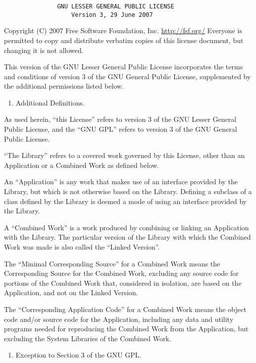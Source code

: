 \begin{verbatim}
               GNU LESSER GENERAL PUBLIC LICENSE
                   Version 3, 29 June 2007
\end{verbatim}

Copyright (C) 2007 Free Software Foundation, Inc. \url{http://fsf.org/}
Everyone is permitted to copy and distribute verbatim copies of this
license document, but changing it is not allowed.

This version of the GNU Lesser General Public License incorporates the
terms and conditions of version 3 of the GNU General Public License,
supplemented by the additional permissions listed below.

\begin{enumerate}
\def\labelenumi{\arabic{enumi}.}
\setcounter{enumi}{-1}
\tightlist
\item
  Additional Definitions.
\end{enumerate}

As used herein, ``this License'' refers to version 3 of the GNU Lesser
General Public License, and the ``GNU GPL'' refers to version 3 of the
GNU General Public License.

``The Library'' refers to a covered work governed by this License, other
than an Application or a Combined Work as defined below.

An ``Application'' is any work that makes use of an interface provided
by the Library, but which is not otherwise based on the Library.
Defining a subclass of a class defined by the Library is deemed a mode
of using an interface provided by the Library.

A ``Combined Work'' is a work produced by combining or linking an
Application with the Library. The particular version of the Library with
which the Combined Work was made is also called the ``Linked Version''.

The ``Minimal Corresponding Source'' for a Combined Work means the
Corresponding Source for the Combined Work, excluding any source code
for portions of the Combined Work that, considered in isolation, are
based on the Application, and not on the Linked Version.

The ``Corresponding Application Code'' for a Combined Work means the
object code and/or source code for the Application, including any data
and utility programs needed for reproducing the Combined Work from the
Application, but excluding the System Libraries of the Combined Work.

\begin{enumerate}
\def\labelenumi{\arabic{enumi}.}
\tightlist
\item
  Exception to Section 3 of the GNU GPL.
\end{enumerate}

